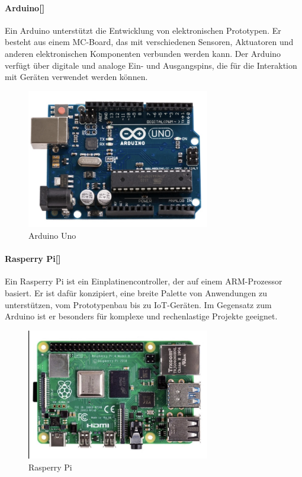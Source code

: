 	\paragraph{Arduino[\cite*[siehe: ]{ArduinoRobotics}]}
	Ein Arduino unterstützt die Entwicklung von elektronischen Prototypen.
	Er besteht aus einem \ac{MC}-Board, das mit verschiedenen Sensoren, Aktuatoren und anderen elektronischen Komponenten verbunden werden kann.
	Der Arduino verfügt über digitale und analoge Ein- und Ausgangspins, die für die Interaktion mit Geräten verwendet werden können.
	\begin{figure}[htbp]
		\centering
		\includegraphics [width=8cm] {img/ArduinoR3}
		\caption{Arduino Uno}
		\label{img:Arduino}
	\end{figure}
\newline

\paragraph{Rasperry Pi[\cite*[siehe: ]{ArduinoVsRaspberry2022}]}
Ein Rasperry Pi ist ein Einplatinencontroller, der auf einem ARM-Prozessor basiert.
Er ist dafür konzipiert, eine breite Palette von Anwendungen zu unterstützen, vom Prototypenbau bis zu IoT-Geräten.
Im Gegensatz zum Arduino ist er besonders für komplexe und rechenlastige Projekte geeignet.
\begin{figure}[htbp]
	\centering
	\includegraphics [width=8cm] {img/RasperryPi}
	\caption{Rasperry Pi}
	\label{img:Raspi}
\end{figure}
\newline

